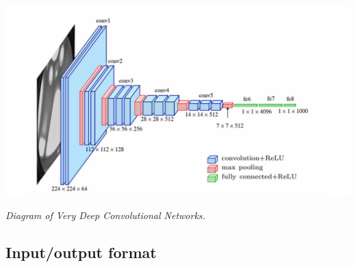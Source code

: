 \vspace{1em}
\begin{center} 
    \includegraphics[width = \textwidth]{../assets/03-model-architecture/cnn-diagram.png}

    \small\textit{Diagram of Very Deep Convolutional Networks. \cite{vcg2021}}
\end{center}
\vspace{1em}


\subsection{Input/output format}

